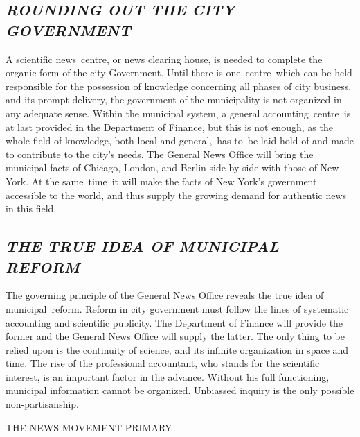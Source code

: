 \documentclass[openany,nobib]{tufte-book}
\begin{document}
\hypertarget{rounding-out-the-city-government}{%
\subsection{\emph{ROUNDING OUT THE CITY
GOVERNMENT}}\label{rounding-out-the-city-government}}

A scientific news~centre, or news clearing house, is needed to complete
the organic form of the city Government. Until there is one~centre~which
can be held responsible for the possession of knowledge concerning all
phases of city business, and its prompt delivery, the government of the
municipality is not organized in any adequate sense. Within the
municipal system, a general accounting~centre~is at last provided in the
Department of Finance, but this is not enough, as the whole field of
knowledge, both local and general,~has to~be laid hold of and made to
contribute to the city's needs. The General News Office will bring the
municipal facts of Chicago, London, and Berlin side by side with those
of New York. At the same~time~it will make the facts of New York's
government accessible to the world, and thus supply the growing demand
for authentic news in this field.~

\hypertarget{the-true-idea-of-municipal-reform}{%
\subsection{\emph{THE TRUE IDEA OF MUNICIPAL
REFORM}}\label{the-true-idea-of-municipal-reform}}

The governing principle of the General News Office reveals the true idea
of municipal~reform. Reform in city government must follow the lines of
systematic accounting and scientific publicity. The Department of
Finance will provide the former and the General News Office will supply
the latter. The only thing to be relied upon is the continuity of
science, and its infinite organization in space and time. The rise of
the professional accountant, who stands for the scientific interest, is
an important factor in the advance. Without his full functioning,
municipal information cannot be organized. Unbiassed inquiry is the only
possible non-partisanship.~

\begin{center}


{\LARGE THE NEWS MOVEMENT PRIMARY}

\end{center}


\end{document}
